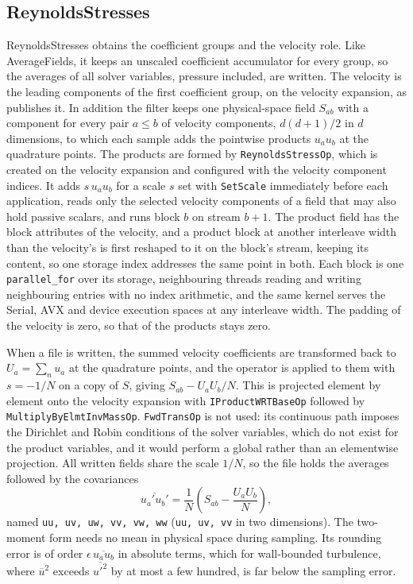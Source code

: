 \subsection{ReynoldsStresses}

ReynoldsStresses obtains the coefficient groups and the velocity role. Like
AverageFields, it keeps an unscaled coefficient accumulator for every group,
so the averages of all solver variables, pressure included, are written.
The velocity is the leading components of the first coefficient group, on
the velocity expansion, as  publishes it. In addition the filter keeps one physical-space
field $S_{ab}$ with a component for every pair $a \le b$ of velocity
components, $d(d+1)/2$ in $d$ dimensions, to which each sample adds the
pointwise products $u_a u_b$ at the quadrature points. The products are
formed by \texttt{ReynoldsStressOp}, which is created on the velocity
expansion and configured with the velocity component indices. It adds
$s\,u_a u_b$ for a scale $s$ set with \texttt{SetScale} immediately before
each application, reads only the selected velocity components of a field that
may also hold passive scalars, and runs block $b$ on stream $b+1$. The product
field has the block attributes of the velocity, and a product block at another
interleave width than the velocity's is first reshaped to it on the block's
stream, keeping its content, so one storage index addresses the same point in
both. Each block is one \texttt{parallel\_for} over its storage, neighbouring
threads reading and writing neighbouring entries with no index arithmetic, and
the same kernel serves the Serial, AVX and device execution spaces at any
interleave width. The padding of the velocity is zero, so that of the
products stays zero.

When a file is written, the summed velocity coefficients are transformed back
to $U_a = \sum_n u_a$ at the quadrature points, and the operator is applied to
them with $s = -1/N$ on a copy of $S$, giving $S_{ab} - U_a U_b/N$. This is
projected element by element onto the velocity expansion with
\texttt{IProductWRTBaseOp} followed by \texttt{MultiplyByElmtInvMassOp}.
\texttt{FwdTransOp} is not used: its continuous path imposes the Dirichlet
and Robin conditions of the solver variables, which do not exist for the
product variables, and it would perform a global rather than an elementwise
projection. All written fields share the scale $1/N$, so the file holds the
averages followed by the covariances
\[
\overline{u_a' u_b'} = \frac{1}{N}\left(S_{ab} - \frac{U_a U_b}{N}\right),
\]
named \texttt{uu, uv, uw, vv, vw, ww} (\texttt{uu, uv, vv} in two dimensions).
The two-moment form needs no mean in physical space during sampling. Its
rounding error is of order $\epsilon\,\overline{u_a u_b}$ in absolute terms,
which for wall-bounded turbulence, where $\overline{u}^2$ exceeds
$\overline{u'^2}$ by at most a few hundred, is far below the sampling error.

